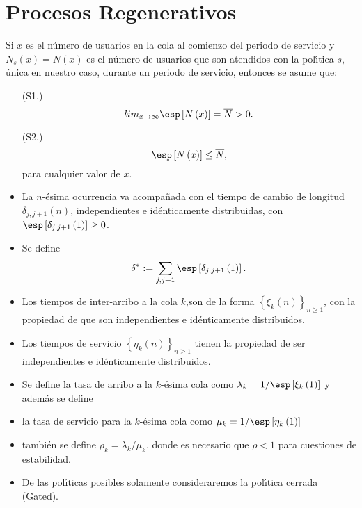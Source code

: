 %
\section{Procesos Regenerativos}

Si $x$ es el n{\'u}mero de usuarios en la cola al comienzo del
periodo de servicio y $N_{s}\left(x\right)=N\left(x\right)$ es el
n{\'u}mero de usuarios que son atendidos con la pol{\'\i}tica $s$,
{\'u}nica en nuestro caso, durante un periodo de servicio,
entonces se asume que:
\begin{itemize}
\item[(S1.)]
\begin{equation}\label{S1}
lim_{x\rightarrow\infty}\esp\left[N\left(x\right)\right]=\overline{N}>0.
\end{equation}
\item[(S2.)]
\begin{equation}\label{S2}
\esp\left[N\left(x\right)\right]\leq \overline{N}, \end{equation}
para cualquier valor de $x$. \item La $n$-{\'e}sima ocurrencia va
acompa{\~n}ada con el tiempo de cambio de longitud
$\delta_{j,j+1}\left(n\right)$, independientes e id{\'e}nticamente
distribuidas, con
$\esp\left[\delta_{j,j+1}\left(1\right)\right]\geq0$. \item Se
define
\begin{equation}
\delta^{*}:=\sum_{j,j+1}\esp\left[\delta_{j,j+1}\left(1\right)\right].
\end{equation}

\item Los tiempos de inter-arribo a la cola $k$,son de la forma
$\left\{\xi_{k}\left(n\right)\right\}_{n\geq1}$, con la propiedad
de que son independientes e id{\'e}nticamente distribuidos.

\item Los tiempos de servicio
$\left\{\eta_{k}\left(n\right)\right\}_{n\geq1}$ tienen la
propiedad de ser independientes e id{\'e}nticamente distribuidos.

\item Se define la tasa de arribo a la $k$-{\'e}sima cola como
$\lambda_{k}=1/\esp\left[\xi_{k}\left(1\right)\right]$ y
adem{\'a}s se define

\item la tasa de servicio para la $k$-{\'e}sima cola como
$\mu_{k}=1/\esp\left[\eta_{k}\left(1\right)\right]$

\item tambi{\'e}n se define $\rho_{k}=\lambda_{k}/\mu_{k}$, donde
es necesario que $\rho<1$ para cuestiones de estabilidad.

\item De las pol{\'\i}ticas posibles solamente consideraremos la
pol{\'\i}tica cerrada (Gated).
\end{itemize}


